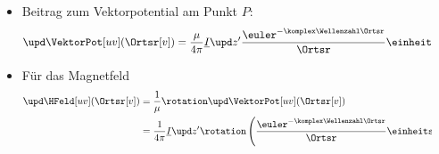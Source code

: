 \begin{frame}
\begin{itemize}[<+->]
\begin{columns}
\begin{column}{.35\textwidth}
\begin{tikzpicture}[scale=5,tdplot_main_coords]
\end{tikzpicture}
\end{column}
\begin{column}{.65\textwidth}
  \begin{itemize}[<+->]
  \item Beitrag zum Vektorpotential am Punkt \(P\):
    \begin{equation*}
      \upd\VektorPot[uv](\Ortsr[v]) = \frac{\mu}{4\pi} \underline{I} \upd z^\prime \frac{\euler^{-\komplex\Wellenzahl\Ortsr}}{\Ortsr} \einheitsvek{z}
    \end{equation*}
  \item Für das Magnetfeld
    \begin{align*}
      \upd\HFeld[uv](\Ortsr[v]) &= \frac{1}{\mu} \rotation \upd\VektorPot[uv](\Ortsr[v])\\
      &= \frac{1}{4\pi} \underline{I} \upd z^\prime \rotation\left(\frac{\euler^{-\komplex\Wellenzahl\Ortsr}}{\Ortsr} \einheitsvek{z}\right)
      \end{align*}
      \end{itemize}
\end{column}
\end{columns}

  \end{itemize}
  \end{frame}

